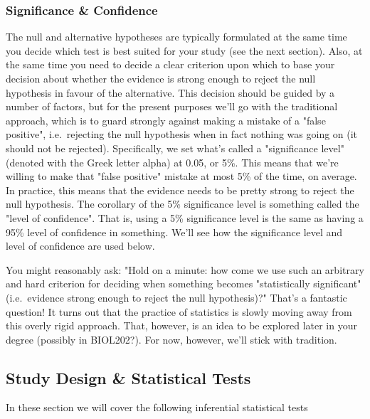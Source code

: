 \documentclass[
]{book}
\begin{document}
\hypertarget{significance-confidence}{%
\subsubsection*{Significance \& Confidence}\label{significance-confidence}}

The null and alternative hypotheses are typically formulated at the same time you decide which test is best suited for your study (see the next section). Also, at the same time you need to decide a clear criterion upon which to base your decision about whether the evidence is strong enough to reject the null hypothesis in favour of the alternative. This decision should be guided by a number of factors, but for the present purposes we'll go with the traditional approach, which is to guard strongly against making a mistake of a "false positive", i.e.~rejecting the null hypothesis when in fact nothing was going on (it should not be rejected). Specifically, we set what's called a "significance level" (denoted with the Greek letter alpha) at 0.05, or 5\%. This means that we're willing to make that "false positive" mistake at most 5\% of the time, on average. In practice, this means that the evidence needs to be pretty strong to reject the null hypothesis. The corollary of the 5\% significance level is something called the "level of confidence". That is, using a 5\% significance level is the same as having a 95\% level of confidence in something. We'll see how the significance level and level of confidence are used below.

You might reasonably ask: "Hold on a minute: how come we use such an arbitrary and hard criterion for deciding when something becomes "statistically significant" (i.e.~evidence strong enough to reject the null hypothesis)?" That's a fantastic question! It turns out that the practice of statistics is slowly moving away from this overly rigid approach. That, however, is an idea to be explored later in your degree (possibly in BIOL202?). For now, however, we'll stick with tradition.

\hypertarget{study-design-statistical-tests}{%
\subsection*{Study Design \& Statistical Tests}\label{study-design-statistical-tests}}

In these section we will cover the following inferential statistical tests
\end{document}
